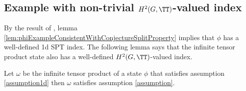 \subsection{Example with non-trivial \texorpdfstring{$H^2(G,\TT)$}{}-valued index}\label{sec:ExampleOneTranslation}
By the result of \cite{ogata2021classification}, lemma \ref{lem:phiExampleConsistentWithConjectureSplitProperty} implies that $\phi$ has a well-defined 1d SPT index. The following lemma says that the infinite tensor product state also has a well-defined $H^2(G,\TT)$-valued index.
\begin{lemma}\label{lem:TensorProductStateHasWellDefinedH^2Index}
	Let $\omega$ be the infinite tensor product of a state $\phi$ that satisfies assumption \ref{assumption1d} then $\omega$ satisfies assumption \ref{assumption}.
\end{lemma}
